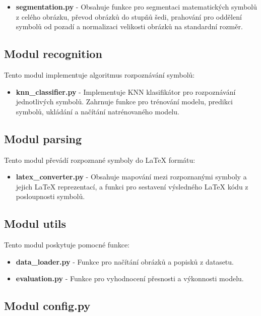\documentclass[12pt,a4paper]{article}
\begin{document}
\begin{itemize}
    \item \textbf{segmentation.py} - Obsahuje funkce pro segmentaci matematických symbolů z celého obrázku, převod obrázků do stupňů šedi, prahování pro oddělení symbolů od pozadí a normalizaci velikosti obrázků na standardní rozměr.
\end{itemize}

\subsection{Modul recognition}

Tento modul implementuje algoritmus rozpoznávání symbolů:

\begin{itemize}
    \item \textbf{knn\_classifier.py} - Implementuje KNN klasifikátor pro rozpoznávání jednotlivých symbolů. Zahrnuje funkce pro trénování modelu, predikci symbolů, ukládání a načítání natrénovaného modelu.
\end{itemize}

\subsection{Modul parsing}

Tento modul převádí rozpoznané symboly do LaTeX formátu:

\begin{itemize}
    \item \textbf{latex\_converter.py} - Obsahuje mapování mezi rozpoznanými symboly a jejich LaTeX reprezentací, a funkci pro sestavení výsledného LaTeX kódu z posloupnosti symbolů.
\end{itemize}

\subsection{Modul utils}

Tento modul poskytuje pomocné funkce:

\begin{itemize}
    \item \textbf{data\_loader.py} - Funkce pro načítání obrázků a popisků z datasetu.
    \item \textbf{evaluation.py} - Funkce pro vyhodnocení přesnosti a výkonnosti modelu.
\end{itemize}

\subsection{Modul config.py}
\end{document}
